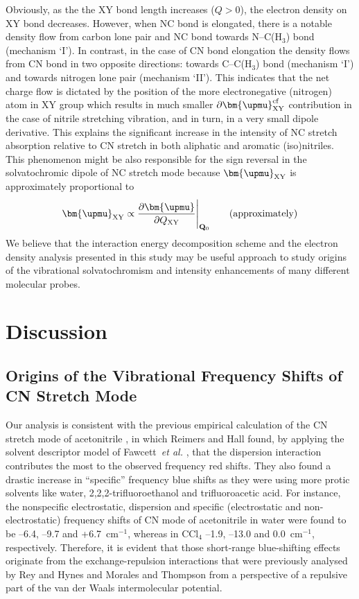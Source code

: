 \documentclass[b5paper,oneside,fleqn,11pt]{book}
\newcommand{\BM}[1]{\bm{#1}}
\newcommand{\fderiv}[2]{\ensuremath{
    \frac{\partial #1}{\partial #2}}}
\begin{document}
\begin{refsection}
Obviously, as the
the XY bond length increases ($Q>0$), the electron density on XY bond decreases. However, 
when NC bond is elongated, there is a notable density flow from carbon lone pair and NC 
bond towards N--C(H$_3$) bond (mechanism `I'). In contrast, in the case of CN bond elongation 
the density flows from CN bond in two opposite directions: towards C--C(H$_3$) bond 
(mechanism `I') and towards nitrogen lone pair (mechanism `II'). This indicates that the net 
charge flow is dictated by the position of the more electronegative (nitrogen) atom in XY group 
which results in much smaller $\partial {\BM \upmu}_{\rm XY}^{\rm cf}$ contribution in the case of
nitrile stretching vibration,
and in turn, in a very small dipole derivative. This explains the significant increase in the 
intensity of NC stretch absorption relative to CN stretch in both aliphatic and aromatic 
(iso)nitriles. This phenomenon might be also responsible for the sign reversal in the
solvatochromic dipole of NC stretch mode because ${\BM \upmu}_{\rm XY}$ is approximately proportional to
%
\begin{equation}
 {\BM \upmu}_{\rm XY} \propto \fderiv{{\BM \upmu}}{Q_{\rm XY}} \Bigg|_{{\bf Q}_{0}} 
    \qquad\text{(approximately)}
\end{equation}
%
We believe that the interaction energy decomposition scheme and the electron density
analysis presented in this study may be useful approach to study origins of the vibrational
solvatochromism and intensity enhancements of many different molecular probes.


\section{Discussion}

\subsection{Origins of the Vibrational Frequency Shifts of CN Stretch Mode}

Our analysis is consistent with the previous empirical
calculation of the CN stretch mode of acetonitrile \citep{Reimers.Hall.JACS.1999}, 
in which
Reimers and Hall found, by applying the solvent descriptor
model of Fawcett~\emph{et al.} \citep{Fawcett.Liu.Kessler.JPC.1993}, 
that the dispersion interaction
contributes the most to the observed frequency red shifts.
They also found a drastic increase in ``specific'' frequency blue
shifts as they were using more protic solvents like water, 
2,2,2\hyp{}trifluoroethanol and trifluoroacetic acid. For instance, the nonspecific
electrostatic, dispersion and specific (electrostatic and
non-electrostatic) frequency shifts of CN mode of acetonitrile
in water were found to be --6.4, --9.7 and +6.7~cm$^{-1}$, whereas in
CCl$_4$ --1.9, --13.0 and 0.0~cm$^{-1}$, respectively. Therefore, it is
evident that those short\hyp{}range blue\hyp{}shifting effects originate
from the exchange\hyp{}repulsion interactions that were previously
analysed by Rey and Hynes \citep{Rey.Hynes.JCP.1998} 
and Morales and Thompson \citep{Morales.Thompson.JPCB.2011}
from a perspective of a repulsive part of the van der Waals
intermolecular potential.


\end{refsection}
\end{document}
